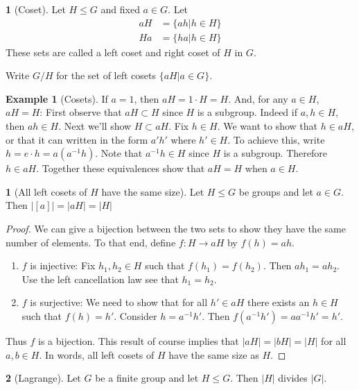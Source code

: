 \documentclass[12pt]{article}
\theoremstyle{definition}
\newtheorem{definition}{\color{NavyBlue}{\textbf{Definition}}}
\newtheorem{theorem}{\color{ForestGreen}{\textbf{Theorem}}}
\newtheorem{example}{\color{WildStrawberry}Example}
\theoremstyle{definition}
\begin{document}
\begin{definition}[Coset]
Let $H \leq G$ and fixed $a \in G$. Let
\begin{align*}
aH &= \{ ah | h \in H \} \\
Ha &= \{ ha | h \in H \} 
\end{align*}
These sets are called a left coset and right coset of $H$ in $G$. 

Write $G/H$ for the set of left cosets $\{aH | a \in G \}$.
\end{definition}

\begin{example}[Cosets]
If $a=1$, then $aH = 1 \cdot H = H$. And, for any $a \in H$, $aH = H$: First observe that $aH \subset H$ since $H$ is a subgroup. Indeed if $a,h \in H$, then $ah \in H$. Next we'll show $H \subset aH$. Fix $h \in H$. We want to show that $h \in aH$, or that it can written in the form $a'h'$ where $h' \in H$. To achieve this, write $h = e \cdot h = a (a^{-1} h)$. Note that $a^{-1} h \in H$ since $H$ is a subgroup. Therefore $h \in aH$. Together these equivalences show that $aH = H$ when $a \in H$. 
\end{example}

\begin{theorem}[All left cosets of $H$ have the same size]
Let $H \leq G$ be groups and let $a \in G$. Then $|[a] | = |aH| = |H|$
\end{theorem}
\begin{proof}
We can give a bijection between the two sets to show they have the same number of elements. To that end, define $f: H \to aH$ by $f(h) = ah$. 
\begin{enumerate}
	\item $f$ is injective: Fix $h_1, h_2 \in H$ such that $f(h_1) = f(h_2)$. Then $a h_1 = a h_2$. Use the left cancellation law see that $h_1 = h_2$. 
	\item $f$ is surjective: We need to show that for all $h' \in aH$ there exists an $h \in H$ such that $f(h) = h'$. Consider $h = a^{-1} h'$. Then $f(a^{-1} h') = a a^{-1} h' = h'$. 
\end{enumerate}
Thus $f$ is a bijection. This result of course implies that $|aH| = |bH| = |H|$ for all $a, b \in H$. In words, all left cosets of $H$ have the same size as $H$. 
\end{proof}

\begin{theorem}[Lagrange]
	Let $G$ be a finite group and let $H \leq G$. Then $|H|$ divides $|G|$.
\end{theorem}
\end{document}
